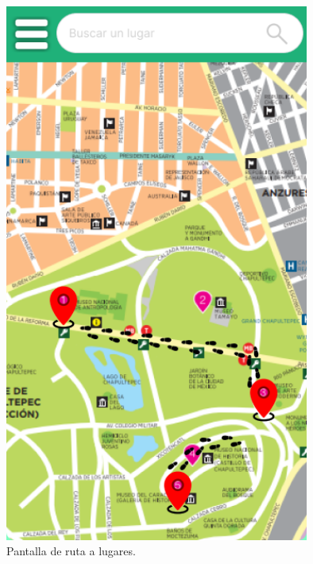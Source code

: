 \begin{figure}[htb]
    \centering
    \includegraphics[width=10cm]{pantalla17.png}
    \caption{Pantalla de ruta a lugares.}
    \label{fig:enter-label}
\end{figure}
